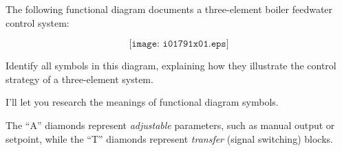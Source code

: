 

The following functional diagram documents a three-element boiler feedwater control system:

$$\texttt{[image: i01791x01.eps]}$$

Identify all symbols in this diagram, explaining how they illustrate the control strategy of a three-element system.







I'll let you research the meanings of functional diagram symbols.







The ``A'' diamonds represent {\it adjustable} parameters, such as manual output or setpoint, while the ``T'' diamonds represent {\it transfer} (signal switching) blocks.




